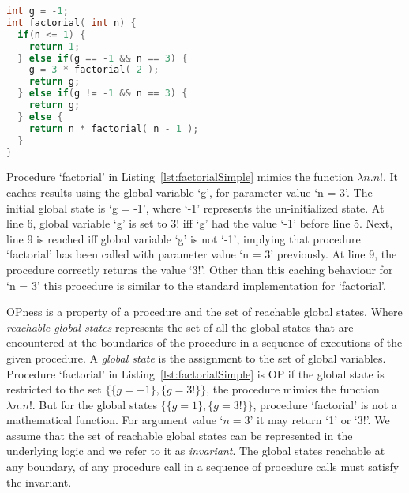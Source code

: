 \documentclass{llncs}
\begin{document}
\begin{lstlisting}[language=c, caption= {Procedure `factorial' :
      returns factorial of `n' and memoizes result for argument value
      `3'.}, label=lst:factorialSimple]
int g = -1;
int factorial( int n) {
  if(n <= 1) {
    return 1;
  } else if(g == -1 && n == 3) {
    g = 3 * factorial( 2 );
    return g;
  } else if(g != -1 && n == 3) {
    return g;
  } else {
    return n * factorial( n - 1 );
  }
}
\end{lstlisting}

Procedure `factorial' in Listing~\ref{lst:factorialSimple} mimics the
function $\lambda n. n!$. It caches results using the global variable
`g', for parameter value `n = 3'. The initial global state is `g =
-1', where `-1' represents the un-initialized state. At line 6, global
variable `g' is set to 3! iff `g' had the value `-1' before line
5. Next, line 9 is reached iff global variable `g' is not `-1',
implying that procedure `factorial' has been called with parameter
value `n = 3' previously. At line 9, the procedure correctly returns
the value `3!'. Other than this caching behaviour for `n = 3' this
procedure is similar to the standard implementation for `factorial'.

OPness is a property of a procedure and the set of reachable global
states. Where \textit{reachable global states} represents the set of
all the global states that are encountered at the boundaries of the
procedure in a sequence of executions of the given procedure. A
\textit{global state} is the assignment to the set of global
variables. Procedure `factorial' in Listing~\ref{lst:factorialSimple}
is OP if the global state is restricted to the set $\{\{g = -1\}, \{g
= 3!\}\}$, the procedure mimics the function $\lambda n.n!$. But for
the global states $\{\{g = 1\}, \{g = 3!\}\}$, procedure `factorial'
is not a mathematical function. For argument value `$n = 3$' it may
return `1' or `3!'.  We assume that the set of reachable global states
can be represented in the underlying logic and we refer to it as
\textit{invariant}.  The global states reachable at any boundary, of
any procedure call in a sequence of procedure calls must satisfy the
invariant.
\end{document}
